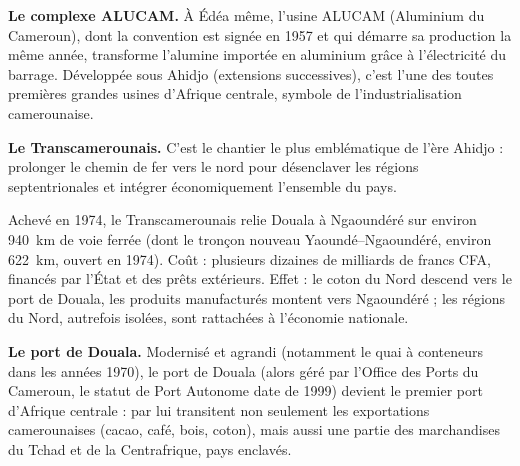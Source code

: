 \documentclass[11pt]{article}
\newcommand{\cle}[1]{{\popxbold\color{popdark}#1}}
\begin{document}
\textbf{Le complexe ALUCAM.} À Édéa même, l'usine \cle{ALUCAM} (Aluminium du Cameroun), dont la convention est signée en 1957 et qui démarre sa production la même année, transforme l'alumine importée en aluminium grâce à l'électricité du barrage. Développée sous Ahidjo (extensions successives), c'est l'une des toutes premières grandes usines d'Afrique centrale, symbole de l'industrialisation camerounaise.

\textbf{Le Transcamerounais.} C'est le chantier le plus emblématique de l'ère Ahidjo : prolonger le chemin de fer vers le nord pour désenclaver les régions septentrionales et intégrer économiquement l'ensemble du pays.

\begin{exemplebox}
Achevé en \cle{1974}, le \cle{Transcamerounais} relie \cle{Douala} à \cle{Ngaoundéré} sur environ \SI{940}{km} de voie ferrée (dont le tronçon nouveau Yaoundé--Ngaoundéré, environ \SI{622}{km}, ouvert en 1974). Coût : plusieurs dizaines de milliards de francs CFA, financés par l'État et des prêts extérieurs. Effet : le coton du Nord descend vers le port de Douala, les produits manufacturés montent vers Ngaoundéré ; les régions du Nord, autrefois isolées, sont rattachées à l'économie nationale.
\end{exemplebox}

\textbf{Le port de Douala.} Modernisé et agrandi (notamment le quai à conteneurs dans les années 1970), le port de Douala (alors géré par l'Office des Ports du Cameroun, le statut de Port Autonome date de 1999) devient le premier port d'Afrique centrale : par lui transitent non seulement les exportations camerounaises (cacao, café, bois, coton), mais aussi une partie des marchandises du Tchad et de la Centrafrique, pays enclavés.
\end{document}
